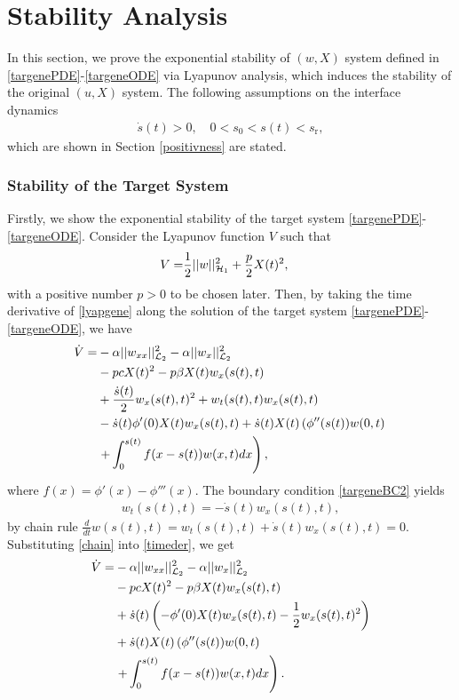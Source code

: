 \documentclass[journal]{IEEEtran}
\begin{document}
\section{Stability Analysis}\label{stability}
In this section, we prove the exponential stability of $(w,X)$ system defined in \eqref{targenePDE}-\eqref{targeneODE} via Lyapunov analysis, which induces the stability  of the original $(u,X)$ system. The following assumptions on the interface dynamics
\begin{align}\label{assumdomain}
\dot{s}(t)>0, \quad 0<s_0<s(t)<s_{{\mathrm r}},
\end{align}
which are shown in Section \ref{positivness} are stated. 
\subsubsection{Stability of the Target System}\label{stabilitytarget}
Firstly, we show the exponential stability of the target system \eqref{targenePDE}-\eqref{targeneODE}. Consider the Lyapunov function $V$ such that 
\begin{align}\label{lyapgene}
V = &\frac{1}{2}||w||_{{\cal H}_1}^2+\frac{p}{2}X(t)^2, 
\end{align}
with a positive number $p>0$ to be chosen later. Then, by taking the time derivative of \eqref{lyapgene} along the solution of the target system \eqref{targenePDE}-\eqref{targeneODE}, we have
\begin{align}\label{timeder}
\dot{V}=&-\alpha|| w_{xx}||_{{\cal L}_2}^2 -\alpha ||w_{x}||_{{\cal L}_2}^2 \notag\\
&-pcX(t)^2 - p\beta X(t) w_x(s(t),t) \notag\\
&+\frac{\dot{s}(t)}{2} w_{x}(s(t),t)^2 + w_{t}(s(t),t) w_{x}(s(t),t) \notag\\
&-\dot{s}(t)\phi'(0) X(t)w_{x}(s(t),t) +\dot{s}(t) X(t)\left( \phi''(s(t)) w(0,t) \right. \notag\\
&\left.+ \int_0^{s(t)} f(x-s(t)) w(x,t)  dx\right), 
\end{align}
where $f(x) = \phi'(x) - \phi'''(x)$. The boundary condition \eqref{targeneBC2} yields 
\begin{align}\label{chain}
 w_{t}(s(t),t) =- \dot{s}(t) w_{x}(s(t),t),
\end{align}
 by chain rule $\frac{d}{dt} w(s(t),t) = w_{t}(s(t),t) + \dot{s}(t) w_{x}(s(t),t) = 0$. Substituting \eqref{chain} into \eqref{timeder}, we get
\begin{align}
\dot{V}=&-\alpha|| w_{xx}||_{{\cal L}_2}^2 -\alpha ||w_{x}||_{{\cal L}_2}^2\notag\\
&-pcX(t)^2- p\beta X(t) w_x(s(t),t) \notag\\
&+\dot{s}(t)\left( -\phi'(0) X(t)w_{x}(s(t),t)-\frac{1}{2}w_x(s(t),t)^2 \right)\notag\\
&+\dot{s}(t) X(t)\left( \phi''(s(t)) w(0,t) \right. \notag\\
&\left.+ \int_0^{s(t)} f(x-s(t)) w(x,t)  dx\right).
\end{align}
\end{document}
